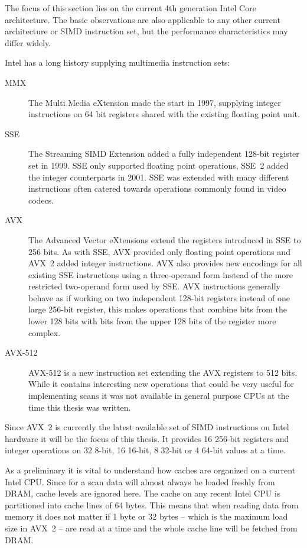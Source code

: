 The focus of this section lies on the current 4th generation Intel Core
architecture. The basic observations are also applicable to any other current
architecture or SIMD instruction set, but the performance characteristics may
differ widely.

Intel has a long history supplying multimedia instruction sets:
\begin{description}
\item[MMX] The Multi Media eXtension made the start in 1997, supplying integer
instructions on 64 bit registers shared with the existing floating point unit.
\item[SSE] The Streaming SIMD Extension added a fully independent 128-bit
register set in 1999. SSE only supported floating point operations, SSE~2 added
the integer counterparts in 2001. SSE was extended with many different
instructions often catered towards operations commonly found in video codecs.
\item[AVX] The Advanced Vector eXtensions extend the registers introduced in
SSE to 256 bits. As with SSE, AVX provided only floating point operations and
AVX~2 added integer instructions. AVX also provides new encodings for all
existing SSE instructions using a three-operand form instead of the more
restricted two-operand form used by SSE. AVX instructions generally behave as
if working on two independent 128-bit registers instead of one large 256-bit
register, this makes operations that combine bits from the lower 128 bits with
bits from the upper 128 bits of the register more complex.
\item[AVX-512] AVX-512 is a new instruction set extending the AVX registers to
512 bits. While it contains interesting new operations that could be very
useful for implementing scans it was not available in general purpose CPUs at
the time this thesis was written.
\end{description}

Since AVX~2 is currently the latest available set of SIMD instructions on Intel
hardware it will be the focus of this thesis. It provides 16 256-bit registers
and integer operations on 32 8-bit, 16 16-bit, 8 32-bit or 4 64-bit values at a
time.

As a preliminary it is vital to understand how caches are organized on a
current Intel CPU. Since for a scan data will almost always be loaded freshly
from DRAM, cache levels are ignored here. The cache on any recent Intel CPU is
partitioned into cache lines of 64 bytes. This means that when reading data
from memory it does not matter if 1 byte or 32 bytes -- which is the maximum load
size in AVX~2 -- are read at a time and the whole cache line will be fetched from
DRAM.

